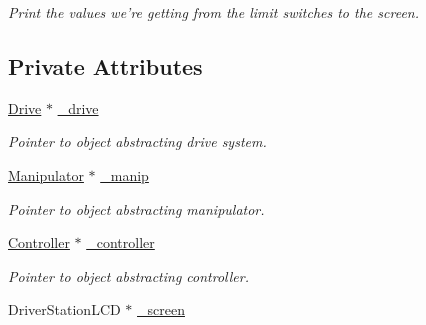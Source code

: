 \begin{DoxyCompactItemize}
\begin{DoxyCompactList}\small\item\em Print the values we're getting from the limit switches to the screen. \item\end{DoxyCompactList}\end{DoxyCompactItemize}
\subsection*{Private Attributes}
\begin{DoxyCompactItemize}
\item 
\hypertarget{class_r_j_f_r_c2011_1_1_teleoperated_acf24bc9abe43a00df74559378f5eef09}{
\hyperlink{class_r_j_f_r_c2011_1_1_drive}{Drive} $\ast$ \hyperlink{class_r_j_f_r_c2011_1_1_teleoperated_acf24bc9abe43a00df74559378f5eef09}{\_\-drive}}
\label{class_r_j_f_r_c2011_1_1_teleoperated_acf24bc9abe43a00df74559378f5eef09}

\begin{DoxyCompactList}\small\item\em Pointer to object abstracting drive system. \item\end{DoxyCompactList}\item 
\hypertarget{class_r_j_f_r_c2011_1_1_teleoperated_a79579c70472b11af4938659c19c246a0}{
\hyperlink{class_r_j_f_r_c2011_1_1_manipulator}{Manipulator} $\ast$ \hyperlink{class_r_j_f_r_c2011_1_1_teleoperated_a79579c70472b11af4938659c19c246a0}{\_\-manip}}
\label{class_r_j_f_r_c2011_1_1_teleoperated_a79579c70472b11af4938659c19c246a0}

\begin{DoxyCompactList}\small\item\em Pointer to object abstracting manipulator. \item\end{DoxyCompactList}\item 
\hypertarget{class_r_j_f_r_c2011_1_1_teleoperated_a7ebf1a9b8ed5f9ac5174c524f50babc0}{
\hyperlink{class_r_j_f_r_c2011_1_1_controller}{Controller} $\ast$ \hyperlink{class_r_j_f_r_c2011_1_1_teleoperated_a7ebf1a9b8ed5f9ac5174c524f50babc0}{\_\-controller}}
\label{class_r_j_f_r_c2011_1_1_teleoperated_a7ebf1a9b8ed5f9ac5174c524f50babc0}

\begin{DoxyCompactList}\small\item\em Pointer to object abstracting controller. \item\end{DoxyCompactList}\item 
\hypertarget{class_r_j_f_r_c2011_1_1_teleoperated_a6a158c8efb6eb673ef4aceb89c614ba6}{
DriverStationLCD $\ast$ \hyperlink{class_r_j_f_r_c2011_1_1_teleoperated_a6a158c8efb6eb673ef4aceb89c614ba6}{\_\-screen}}
\label{class_r_j_f_r_c2011_1_1_teleoperated_a6a158c8efb6eb673ef4aceb89c614ba6}


\end{DoxyCompactItemize}
